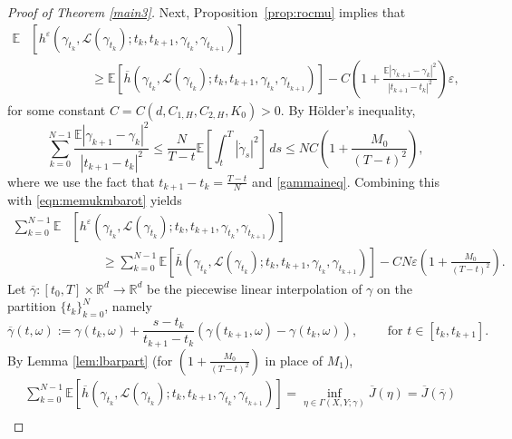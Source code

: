 \documentclass[reqno,11pt]{amsart}
\numberwithin{equation}{section}
\newcommand{\R}{\mathbb{R}} %
\newcommand{\e}{\varepsilon}
\newcommand{\nd}{\noindent}
\renewcommand{\bar}{\overline}
\begin{document}
\begin{proof}[Proof of Theorem \ref{main3}]
\nd
Next, Proposition~\ref{prop:rocmu} implies that
\begin{equation}\label{eqn:memukmbarot}
\begin{split}
\mathbb{E}&\left[h^\e\left(\gamma_{t_k}, \mathcal{L}(\gamma_{t_k}); t_k,t_{k+1},
\gamma_{t_k},\gamma_{t_{k+1}}\right)\right]\\
&\hspace{2cm}\geq \mathbb{E}\left[\bar{h}\left(\gamma_{t_k}, \mathcal{L}(\gamma_{t_k}); t_k,t_{k+1},
\gamma_{t_k},\gamma_{t_{k+1}}\right)\right] -C\left(1+\frac{ \mathbb{E}\left|\gamma_{k+1}-\gamma_k\right|^2}{|t_{k+1}-t_k|^2}\right) \e,
\end{split}
\end{equation}
for some constant $C=C(d, C_{1,H},C_{2,H},K_0)>0$. By H\"older's inequality,
\[
\sum_{k=0}^{N-1}\frac{ \mathbb{E}\left|\gamma_{k+1}-\gamma_k\right|^2}{|t_{k+1}-t_k|^2}\leq \frac{N}{T-t} \mathbb{E} \left[\int_{t}^T\left|\dot{\gamma}_s\right|^2\right]\,
ds \leq NC\left(1+\frac{M_0}{(T-t)^2}\right),
\]
where we use the fact that $t_{k+1}-t_k=\frac{T-t}{N}$ and \eqref{gammaineq}. Combining this with \eqref{eqn:memukmbarot} yields
\begin{equation}\label{eqn:rocsumerrot}
\begin{split}
\sum_{k=0}^{N-1}
\mathbb E&\left[h^\e\left(\gamma_{t_k}, \mathcal{L}(\gamma_{t_k}); t_k,t_{k+1},
\gamma_{t_k},\gamma_{t_{k+1}}\right)\right]\\
&\hspace{1cm}\ge\sum_{k=0}^{N-1}\mathbb{E}\left[\bar{h}\left(\gamma_{t_k}, \mathcal{L}(\gamma_{t_k}); t_k,t_{k+1},
\gamma_{t_k},\gamma_{t_{k+1}}\right)\right] -C N\e\left(1+\frac{M_0}{(T-t)^2}\right).
\end{split}
\end{equation}
Let $\bar\gamma:[t_0,T] \times \R^d \to \R^d$ be the piecewise linear interpolation of $\gamma$ on the partition $\{t_k\}_{k=0}^N$, namely
\[
\bar{\gamma}(t,\omega):=\gamma(t_k,\omega)+\frac{s-t_k}{t_{k+1}-t_k}\left(\gamma(t_{k+1}, \omega)-\gamma(t_k,\omega)\right), \qquad \text{ for } t \in \left[t_k, t_{k+1}\right].
\]
By Lemma \ref{lem:lbarpart} (for $\left(1+\frac{M_0}{(T-t)^2}\right)$ in place of $M_1$),
\begin{equation}\label{eqn:admgabarot}
\begin{aligned}
&\sum_{k=0}^{N-1}
\mathbb{E}\left[\bar{h}\left(\gamma_{t_k}, \mathcal{L}(\gamma_{t_k}); t_k,t_{k+1},
\gamma_{t_k},\gamma_{t_{k+1}}\right)\right]=\inf_{\eta\in \Gamma(X,Y;\gamma)} \bar J(\eta)=\bar{J}(\bar{\gamma})\\

\end{aligned}
\end{equation}
\end{proof}
\end{document}
